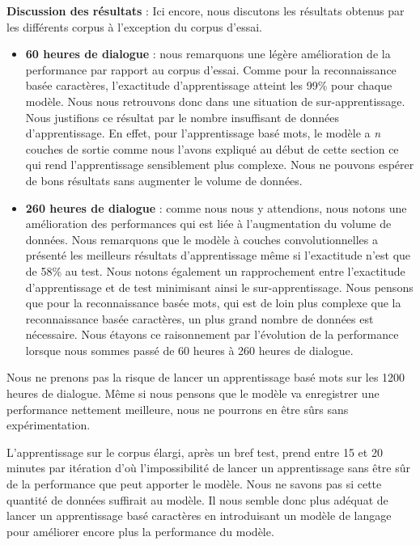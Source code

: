 \textbf{Discussion des résultats} : Ici encore, nous discutons les résultats obtenus par les différents corpus à l'exception du corpus d'essai. 
\begin{itemize}

    \item \textbf{60 heures de dialogue} : nous remarquons une légère amélioration de la performance par rapport au corpus d'essai. Comme pour la reconnaissance basée caractères, l'exactitude d'apprentissage atteint les 99\% pour chaque modèle. Nous nous retrouvons donc dans une situation de sur-apprentissage. Nous justifions ce résultat par le nombre insuffisant de données d'apprentissage. En effet, pour l'apprentissage basé mots, le modèle a \textit{n} couches de sortie comme nous l'avons expliqué au début de cette section ce qui rend l'apprentissage sensiblement plus complexe. Nous ne pouvons espérer de bons résultats sans augmenter le volume de données. \\ 
    
    \item \textbf{260 heures de dialogue} : comme nous nous y attendions, nous notons une amélioration des performances qui est liée à l'augmentation du volume de données. Nous remarquons que le modèle à couches convolutionnelles a présenté les meilleurs résultats d'apprentissage même si l'exactitude n'est que de 58\% au test. Nous notons également un rapprochement entre l'exactitude d'apprentissage et de test minimisant ainsi le sur-apprentissage. Nous pensons que pour la reconnaissance basée mots, qui est de loin plus complexe que la reconnaissance basée caractères, un plus grand nombre de données est nécessaire. Nous étayons ce raisonnement par l'évolution de la performance lorsque nous sommes passé de 60 heures à 260 heures de dialogue. \\
\end{itemize}

Nous ne prenons pas la risque de lancer un apprentissage basé mots sur les 1200 heures de dialogue. Même si nous pensons que le modèle va enregistrer une performance nettement meilleure, nous ne pourrons en être sûrs sans expérimentation. 

L'apprentissage sur le corpus élargi, après un bref test, prend entre 15 et 20 minutes par itération d'où l'impossibilité de lancer un apprentissage sans être sûr de la performance que peut apporter le modèle. Nous ne savons pas si cette quantité de données suffirait au modèle. Il nous semble donc plus adéquat de lancer un apprentissage basé caractères en introduisant un modèle de langage pour améliorer encore plus la performance du modèle.


